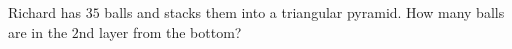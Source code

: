 Richard has $35$ balls and stacks them into a triangular pyramid. How many balls are in the $2$nd layer from the bottom?
